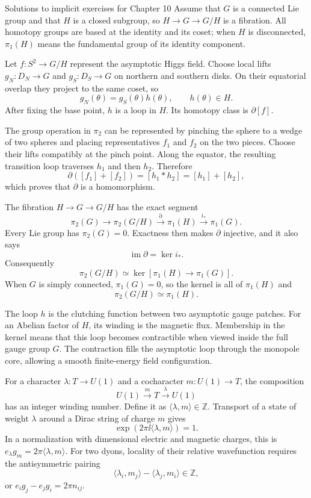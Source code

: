 \begin{bankssolutions}{Solutions to implicit exercises for Chapter 10}
Assume that $G$ is a connected Lie group and that $H$ is a closed subgroup,
so $H\to G\to G/H$ is a fibration.  All homotopy groups are based at the
identity and its coset; when $H$ is disconnected, $\pi_1(H)$ means the
fundamental group of its identity component.

Let $f:S^2\to G/H$ represent the asymptotic Higgs field.  Choose local lifts
$g_N:D_N\to G$ and $g_S:D_S\to G$ on northern and southern disks.  On their
equatorial overlap they project to the same coset, so
\[
  g_N(\theta)=g_S(\theta)h(\theta),
  \qquad h(\theta)\in H.
\]
After fixing the base point, $h$ is a loop in $H$.  Its homotopy class is
$\partial[f]$.

The group operation in $\pi_2$ can be represented by pinching the sphere to a
wedge of two spheres and placing representatives $f_1$ and $f_2$ on the two
pieces.  Choose their lifts compatibly at the pinch point.  Along the equator,
the resulting transition loop traverses $h_1$ and then $h_2$.  Therefore
\[
  \partial([f_1]+[f_2])
  =[h_1*h_2]
  =[h_1]+[h_2],
\]
which proves that $\partial$ is a homomorphism.

The fibration $H\to G\to G/H$ has the exact segment
\[
  \pi_2(G)\longrightarrow\pi_2(G/H)
  \xrightarrow{\partial}\pi_1(H)
  \xrightarrow{i_*}\pi_1(G).
\]
Every Lie group has $\pi_2(G)=0$.  Exactness then makes $\partial$ injective,
and it also says
\[
  \operatorname{im}\partial=\ker i_*.
\]
Consequently
\[
  \pi_2(G/H)\simeq
  \ker\!\left[\pi_1(H)\to\pi_1(G)\right].
\]
When $G$ is simply connected, $\pi_1(G)=0$, so the kernel is all of
$\pi_1(H)$ and
\[
  \pi_2(G/H)\simeq\pi_1(H).
\]

The loop $h$ is the clutching function between two asymptotic gauge patches.
For an Abelian factor of $H$, its winding is the magnetic flux.  Membership in
the kernel means that this loop becomes contractible when viewed inside the
full gauge group $G$.  The contraction fills the asymptotic loop through the
monopole core, allowing a smooth finite-energy field configuration.

For a character $\lambda:T\to U(1)$ and a cocharacter
$m:U(1)\to T$, the composition
\[
  U(1)\xrightarrow{m}T\xrightarrow{\lambda}U(1)
\]
has an integer winding number.  Define it as
$\langle\lambda,m\rangle\in\mathbb Z$.  Transport of a state of weight
$\lambda$ around a Dirac string of charge $m$ gives
\[
  \exp\left(2\pi\ii\langle\lambda,m\rangle\right)=1.
\]
In a normalization with dimensional electric and magnetic charges, this is
$e_\lambda g_m=2\pi\langle\lambda,m\rangle$.  For two dyons, locality of their
relative wavefunction requires the antisymmetric pairing
\[
  \langle\lambda_i,m_j\rangle-\langle\lambda_j,m_i\rangle
  \in\mathbb Z,
\]
or
$e_i g_j-e_jg_i=2\pi n_{ij}$.


\end{bankssolutions}
